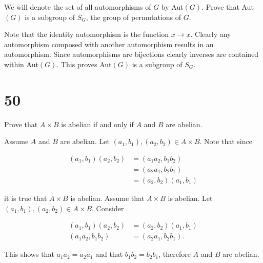 \documentclass[a4paper]{article}
\begin{document}
We will denote the set of all automorphisms of $G$ by Aut$(G)$. Prove that Aut$(G)$ is a subgroup of $S_G$, the group of permutations of $G$.

\vspace{\baselineskip}

Note that the identity automorphism is the function $x \rightarrow x$. Clearly any automorphism composed with another automorphism results in an automorphism. Since automorphisms are bijections clearly inverses are contained within Aut$(G)$. This proves Aut$(G)$ is a subgroup of $S_G$.


\section*{50}

Prove that $A \times B$ is abelian if and only if $A$ and $B$ are abelian.

\vspace{\baselineskip}

Assume $A$ and $B$ are abelian. Let $(a_1, b_1), (a_2, b_2) \in A \times B$. Note that since

\begin{align*}
(a_1, b_1) (a_2, b_2) &= (a_1 a_2, b_1 b_2) \\
&= (a_2 a_1, b_2 b_1) \\
&= (a_2, b_2) (a_1, b_1)
\end{align*}

it is true that $A \times B$ is abelian. Assume that $A \times B$ is abelian. Let $(a_1, b_1), (a_2, b_2) \in A \times B$. Consider

\begin{align*}
(a_1, b_1) (a_2, b_2) &= (a_2, b_2) (a_1, b_1) \\ 
(a_1 a_2, b_1 b_2) &= (a_2 a_1, b_2 b_1).
\end{align*}

This shows that $a_1 a_2 = a_2 a_1$ and that $b_1 b_2 = b_2 b_1$, therefore $A$ and $B$ are abelian.
\end{document}
